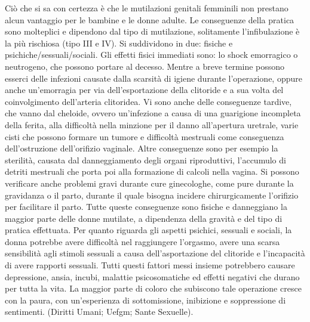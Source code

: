 Ciò che si sa con certezza è che le mutilazioni genitali femminili non prestano alcun vantaggio per le bambine e le donne adulte. Le conseguenze della pratica sono molteplici e dipendono dal tipo di mutilazione, solitamente l’infibulazione è la più rischiosa (tipo III e IV). Si suddividono in due: fisiche e psichiche/sessuali/sociali. Gli effetti fisici immediati sono: lo shock emorragico o neutrogeno, che possono portare al decesso. Mentre a breve termine possono esserci delle infezioni causate dalla scarsità di igiene durante l’operazione, oppure anche un’emorragia per via dell’esportazione della clitoride e a sua volta del coinvolgimento dell’arteria clitoridea. 
Vi sono anche delle conseguenze tardive, che vanno dal cheloide, ovvero un’infezione a causa di una guarigione incompleta della ferita, alla difficoltà nella minzione per il danno all’apertura uretrale, varie cisti che possono formare un tumore e difficoltà mestruali come conseguenza dell'ostruzione dell’orifizio vaginale. Altre conseguenze sono per esempio la sterilità, causata dal danneggiamento degli organi riproduttivi, l’accumulo di detriti mestruali che porta poi alla formazione di calcoli nella vagina. Si possono verificare anche problemi gravi durante cure ginecologhe, come pure durante la gravidanza o il parto, durante il quale bisogna incidere chirurgicamente l’orifizio per facilitare il parto. Tutte queste conseguenze sono fisiche e danneggiano la maggior parte delle donne mutilate, a dipendenza della gravità e del tipo di pratica effettuata. 
Per quanto riguarda gli aspetti psichici, sessuali e sociali, la donna potrebbe avere difficoltà nel raggiungere l’orgasmo, avere una scarsa sensibilità agli stimoli sessuali a causa dell’asportazione del clitoride e l’incapacità di avere rapporti sessuali. Tutti questi fattori messi insieme potrebbero causare depressione, ansia, incubi, malattie psicosomatiche ed effetti negativi che durano per tutta la vita. La maggior parte di coloro che subiscono tale operazione cresce con la paura, con un’esperienza di sottomissione, inibizione e soppressione di sentimenti. (Diritti Umani; Uefgm; Sante Sexuelle).
